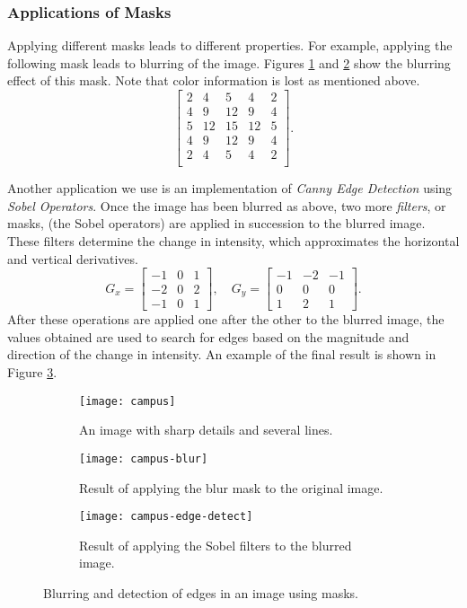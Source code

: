 \documentclass[addpoints]{exam}
\begin{document}
\subsubsection{Applications of Masks}

Applying different masks leads to different properties. For example, applying the following mask leads to blurring of the image. Figures \ref{fig:mask-orig} and \ref{fig:mask-blur} show the blurring effect of this mask. Note that color information is lost as mentioned above.
\[
  \left[
    \begin{array}{ccccc}
      2 & 4 & 5 & 4 & 2\\
      4 & 9 & 12 & 9 & 4\\
      5 & 12 & 15 & 12 & 5\\
      4 & 9 & 12 & 9 & 4\\
      2 & 4 & 5 & 4 & 2\\
    \end{array}          
  \right].
\]

Another application we use is an implementation of \textit{Canny Edge Detection} using \textit{Sobel Operators}. Once the image has been blurred as above, two more \textit{filters}, or masks, (the Sobel operators) are applied in succession to the blurred image. These filters determine the change in intensity, which approximates the horizontal and vertical derivatives.
\[
  G_x =   \left[
    \begin{array}{ccc}
      -1 & 0 & 1\\
      -2 & 0 & 2\\
      -1 & 0 & 1
    \end{array}
      \right], \quad
  G_y =   \left[
    \begin{array}{ccc}
      -1 & -2 & -1\\
      0 & 0 & 0\\
      1 & 2 & 1
    \end{array}    
  \right].
\]
After these operations are applied one after the other to the blurred image, the values obtained are used to search for edges based on the magnitude and direction of the change in intensity. An example of the final result is shown in Figure \ref{fig:mask-edge}.

\begin{figure}
  \centering
  \begin{subfigure}{.31\textwidth}
    \texttt{[image: campus]}
    \caption{An image with sharp details and several lines.}\label{fig:mask-orig}
  \end{subfigure}
  \begin{subfigure}[c]{.31\textwidth}
    \texttt{[image: campus-blur]}
    \caption{Result of applying the blur mask to the original image.}\label{fig:mask-blur}
  \end{subfigure}
  \begin{subfigure}[c]{.31\textwidth}
    \texttt{[image: campus-edge-detect]}
    \caption{Result of applying the Sobel filters to the blurred image.}\label{fig:mask-edge}
  \end{subfigure}
  \caption{Blurring and detection of edges in an image using masks.}
  \label{fig:mask-apply}
\end{figure}
\end{document}
